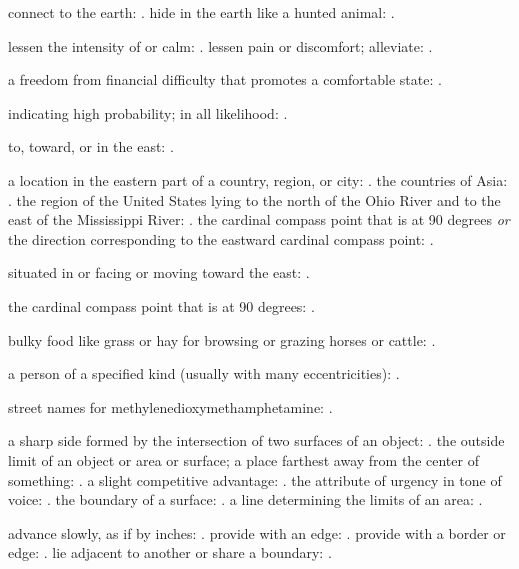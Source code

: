   connect to the earth: . hide in the earth like a hunted animal: .

  lessen the intensity of or calm: . lessen pain or discomfort; alleviate: .

  a freedom from financial difficulty that promotes a comfortable state: .

  indicating high probability; in all likelihood: .

  to, toward, or in the east: .

  a location in the eastern part of a country, region, or city: . the countries of Asia: . the region of the United States lying to the north of the Ohio River and to the east of the Mississippi River: . the cardinal compass point that is at 90 degrees \textit{or} the direction corresponding to the eastward cardinal compass point: .

  situated in or facing or moving toward the east: .

  the cardinal compass point that is at 90 degrees: .

  bulky food like grass or hay for browsing or grazing horses or cattle: .

  a person of a specified kind (usually with many eccentricities): .

  street names for methylenedioxymethamphetamine: .

  a sharp side formed by the intersection of two surfaces of an object: . the outside limit of an object or area or surface; a place farthest away from the center of something: . a slight competitive advantage: . the attribute of urgency in tone of voice: . the boundary of a surface: . a line determining the limits of an area: .

  advance slowly, as if by inches: . provide with an edge: . provide with a border or edge: . lie adjacent to another or share a boundary: .

